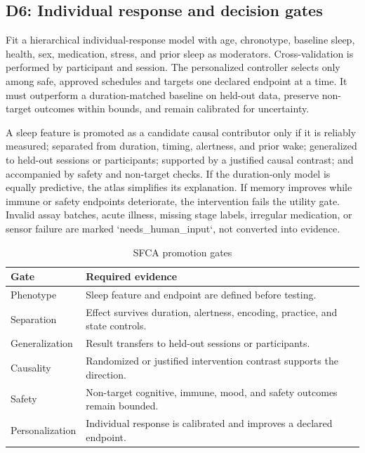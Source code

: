 \documentclass[conference]{IEEEtran}
\begin{document}
\subsection{D6: Individual response and decision gates}
Fit a hierarchical individual-response model with age, chronotype, baseline sleep, health, sex, medication, stress, and prior sleep as moderators. Cross-validation is performed by participant and session. The personalized controller selects only among safe, approved schedules and targets one declared endpoint at a time. It must outperform a duration-matched baseline on held-out data, preserve non-target outcomes within bounds, and remain calibrated for uncertainty.

A sleep feature is promoted as a candidate causal contributor only if it is reliably measured; separated from duration, timing, alertness, and prior wake; generalized to held-out sessions or participants; supported by a justified causal contrast; and accompanied by safety and non-target checks. If the duration-only model is equally predictive, the atlas simplifies its explanation. If memory improves while immune or safety endpoints deteriorate, the intervention fails the utility gate. Invalid assay batches, acute illness, missing stage labels, irregular medication, or sensor failure are marked `needs\_human\_input`, not converted into evidence.

\begin{table}[t]
\caption{SFCA promotion gates}
\label{tab:gates}
\centering
\footnotesize
\setlength{\tabcolsep}{2pt}
\begin{tabular}{p{}p{}}
\toprule
Gate & Required evidence \\
\midrule
Phenotype & Sleep feature and endpoint are defined before testing. \\
Separation & Effect survives duration, alertness, encoding, practice, and state controls. \\
Generalization & Result transfers to held-out sessions or participants. \\
Causality & Randomized or justified intervention contrast supports the direction. \\
Safety & Non-target cognitive, immune, mood, and safety outcomes remain bounded. \\
Personalization & Individual response is calibrated and improves a declared endpoint. \\
\bottomrule
\end{tabular}
\end{table}
\end{document}
